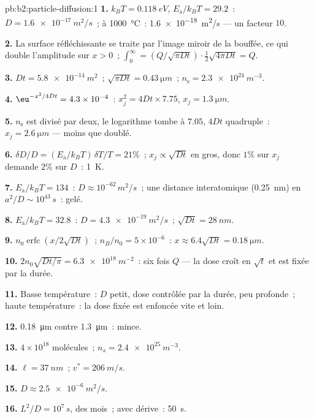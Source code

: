 \begin{solution}{pb:b2:particle-diffusion:1}
\textbf{1.} $k_BT = \qty{0.118}{eV}$, $E_{\text{a}}/k_BT = 29.2$~: $D =
\qty{1.6e-17}{m^2/s}$~; à \qty{1000}{\celsius}~: \qty{1.6e-18}{m^2/s} --- un
facteur $10$.

\textbf{2.} La surface réfléchissante se traite par l'image miroir de la
bouffée, ce qui double l'amplitude sur $x > 0$~; $\int_0^\infty = (Q/\sqrt{\pi Dt})
\cdot \tfrac12\sqrt{4\pi Dt} = Q$.

\textbf{3.} $Dt = \qty{5.8e-14}{m^2}$~; $\sqrt{\pi Dt} = \qty{0.43}{\micro m}$~; $n_{\text{s}}
= \qty{2.3e24}{m^{-3}}$.

\textbf{4.} $\eu^{-x^2/4Dt} = 4.3 \times 10^{-4}$~: $x_j^2 = 4Dt \times 7.75$, $x_j =
\qty{1.3}{\micro m}$.

\textbf{5.} $n_{\text{s}}$ est divisé par deux, le logarithme tombe à $7.05$, $4Dt$
quadruple~: $x_j = \qty{2.6}{\micro m}$ --- moins que doublé.

\textbf{6.} $\delta D/D = (E_{\text{a}}/k_BT)\,\delta T/T = 21\%$~; $x_j \propto
\sqrt{Dt}$ en gros, donc $1\%$ sur $x_j$ demande $2\%$ sur $D$~: \qty{1}{K}.

\textbf{7.} $E_{\text{a}}/k_BT = 134$~: $D \approx 10^{-62}\,\unit{m^2/s}$~; une
distance interatomique (\qty{0.25}{nm}) en $a^2/D \sim 10^{43}\,\unit{s}$~: gelé.

\textbf{8.} $E_{\text{a}}/k_BT = 32.8$~: $D = \qty{4.3e-19}{m^2/s}$~; $\sqrt{Dt} =
\qty{28}{nm}$.

\textbf{9.} $n_0\operatorname{erfc}(x/2\sqrt{Dt})$~; $n_B/n_0 = 5 \times 10^{-6}$~:
$x \approx 6.4\sqrt{Dt} = \qty{0.18}{\micro m}$.

\textbf{10.} $2n_0\sqrt{Dt/\pi} = \qty{6.3e18}{m^{-2}}$~: six fois $Q$ ---
la dose croît en $\sqrt t$ et est fixée par la durée.

\textbf{11.} Basse température~: $D$ petit, dose contrôlée par la durée,
peu profonde~; haute température~: la dose fixée est enfoncée vite et loin.

\textbf{12.} \qty{0.18}{\micro m} contre \qty{1.3}{\micro m}~: mince.

\textbf{13.} $4 \times 10^{18}$ molécules~; $n_{\text{a}} = \qty{2.4e25}{m^{-3}}$.

\textbf{14.} $\ell = \qty{37}{nm}$~; $v^* = \qty{206}{m/s}$.

\textbf{15.} $D \approx \qty{2.5e-6}{m^2/s}$.

\textbf{16.} $L^2/D = 10^7\,\unit{s}$, des mois~; avec dérive~: \qty{50}{s}.


\end{solution}
